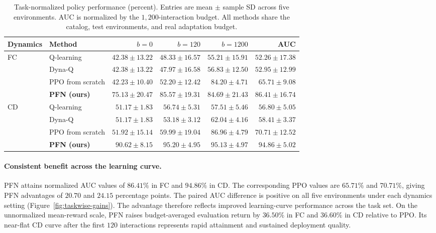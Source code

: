 \documentclass[a4paper,11pt]{article}
\numberwithin{equation}{section}
\begin{document}
\begin{table}[htbp]
\centering\small
\caption{Task-normalized policy performance (percent). Entries are mean $\pm$ sample SD across five environments. AUC is normalized by the $1{,}200$-interaction budget. All methods share the catalog, test environments, and real adaptation budget.}
\label{tab:learning}
\setlength{\tabcolsep}{4pt}
\begin{tabular*}{\textwidth}{@{\extracolsep{\fill}}llrrrr@{}}
\toprule
Dynamics & Method & $b=0$ & $b=120$ & $b=1200$ & AUC\\\midrule
FC & Q-learning & $42.38\pm13.22$ & $48.33\pm16.57$ & $55.21\pm15.91$ & $52.26\pm17.38$\\
& Dyna-Q & $42.38\pm13.22$ & $47.97\pm16.58$ & $56.83\pm12.50$ & $52.95\pm12.99$\\
& PPO from scratch & $42.23\pm10.40$ & $52.20\pm12.42$ & $84.20\pm4.71$ & $65.71\pm9.08$\\
& \textbf{PFN (ours)} & $\mathbf{75.13}\pm20.47$ & $\mathbf{85.57}\pm19.31$ & $\mathbf{84.69}\pm21.43$ & $\mathbf{86.41}\pm16.74$\\\midrule
CD & Q-learning & $51.17\pm1.83$ & $56.74\pm5.31$ & $57.51\pm5.46$ & $56.80\pm5.05$\\
& Dyna-Q & $51.17\pm1.83$ & $53.18\pm3.12$ & $62.04\pm4.16$ & $58.41\pm3.37$\\
& PPO from scratch & $51.92\pm15.14$ & $59.99\pm19.04$ & $86.96\pm4.79$ & $70.71\pm12.52$\\
& \textbf{PFN (ours)} & $\mathbf{90.62}\pm8.15$ & $\mathbf{95.20}\pm4.95$ & $\mathbf{95.13}\pm4.97$ & $\mathbf{94.86}\pm5.02$\\
\bottomrule
\end{tabular*}
\end{table}

\paragraph{Consistent benefit across the learning curve.}
PFN attains normalized AUC values of $86.41\%$ in FC and $94.86\%$ in CD. The corresponding PPO values are $65.71\%$ and $70.71\%$, giving PFN advantages of $20.70$ and $24.15$ percentage points. The paired AUC difference is positive on all five environments under each dynamics setting (Figure~\ref{fig:taskwise-gains}). The advantage therefore reflects improved learning-curve performance across the task set. On the unnormalized mean-reward scale, PFN raises budget-averaged evaluation return by $36.50\%$ in FC and $36.60\%$ in CD relative to PPO. Its near-flat CD curve after the first $120$ interactions represents rapid attainment and sustained deployment quality.
\end{document}
